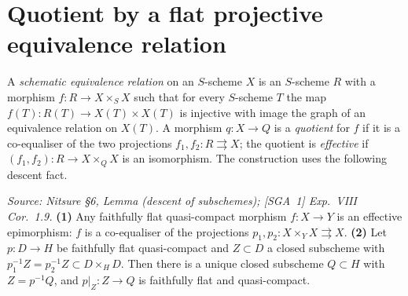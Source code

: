 \section{Quotient by a flat projective equivalence relation}

A \emph{schematic equivalence relation} on an $S$-scheme $X$ is an $S$-scheme $R$
with a morphism $f\colon R\to X\times_S X$ such that for every $S$-scheme $T$ the
map $f(T)\colon R(T)\to X(T)\times X(T)$ is injective with image the graph of an
equivalence relation on $X(T)$. A morphism $q\colon X\to Q$ is a \emph{quotient}
for $f$ if it is a co-equaliser of the two projections
$f_1,f_2\colon R\rightrightarrows X$; the quotient is \emph{effective} if
$(f_1,f_2)\colon R\to X\times_Q X$ is an isomorphism. The construction uses the
following descent fact.

\begin{lemma}
  \label{lem:descent-of-subschemes}
  \textit{Source: Nitsure §6, Lemma (descent of subschemes); [SGA~1] Exp.~VIII Cor.~1.9.}
  \textbf{(1)} Any faithfully flat quasi-compact morphism $f\colon X\to Y$ is an
  effective epimorphism: $f$ is a co-equaliser of the projections
  $p_1,p_2\colon X\times_Y X\rightrightarrows X$. \textbf{(2)} Let
  $p\colon D\to H$ be faithfully flat quasi-compact and $Z\subset D$ a closed
  subscheme with $p_1^{-1}Z = p_2^{-1}Z\subset D\times_H D$. Then there is a
  unique closed subscheme $Q\subset H$ with $Z = p^{-1}Q$, and $p|_Z\colon Z\to Q$
  is faithfully flat and quasi-compact.
\end{lemma}

